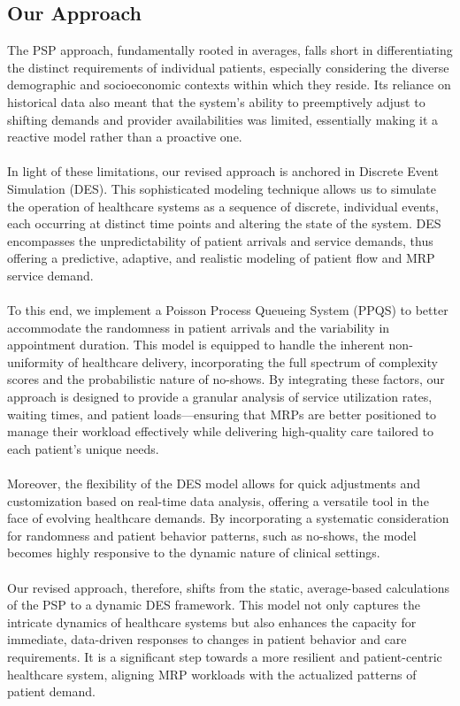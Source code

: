 \documentclass[11pt]{article}
\theoremstyle{definition}
\begin{document}
\subsection*{Our Approach}
The PSP approach, fundamentally rooted in averages, falls short in differentiating the distinct requirements of individual patients, especially considering the diverse demographic and socioeconomic contexts within which they reside. Its reliance on historical data also meant that the system's ability to preemptively adjust to shifting demands and provider availabilities was limited, essentially making it a reactive model rather than a proactive one.\\\\
In light of these limitations, our revised approach is anchored in Discrete Event Simulation (DES). This sophisticated modeling technique allows us to simulate the operation of healthcare systems as a sequence of discrete, individual events, each occurring at distinct time points and altering the state of the system. DES encompasses the unpredictability of patient arrivals and service demands, thus offering a predictive, adaptive, and realistic modeling of patient flow and MRP service demand. \cite{Robinson2020}\\\\ To this end, we implement a Poisson Process Queueing System (PPQS) to better accommodate the randomness in patient arrivals and the variability in appointment duration. This model is equipped to handle the inherent non-uniformity of healthcare delivery, incorporating the full spectrum of complexity scores and the probabilistic nature of no-shows. By integrating these factors, our approach is designed to provide a granular analysis of service utilization rates, waiting times, and patient loads—ensuring that MRPs are better positioned to manage their workload effectively while delivering high-quality care tailored to each patient's unique needs.\\\\
Moreover, the flexibility of the DES model allows for quick adjustments and customization based on real-time data analysis, offering a versatile tool in the face of evolving healthcare demands. By incorporating a systematic consideration for randomness and patient behavior patterns, such as no-shows, the model becomes highly responsive to the dynamic nature of clinical settings.\\\\
Our revised approach, therefore, shifts from the static, average-based calculations of the PSP to a dynamic DES framework. This model not only captures the intricate dynamics of healthcare systems but also enhances the capacity for immediate, data-driven responses to changes in patient behavior and care requirements. It is a significant step towards a more resilient and patient-centric healthcare system, aligning MRP workloads with the actualized patterns of patient demand. \cite{Ansell2017}\\\\
\end{document}
